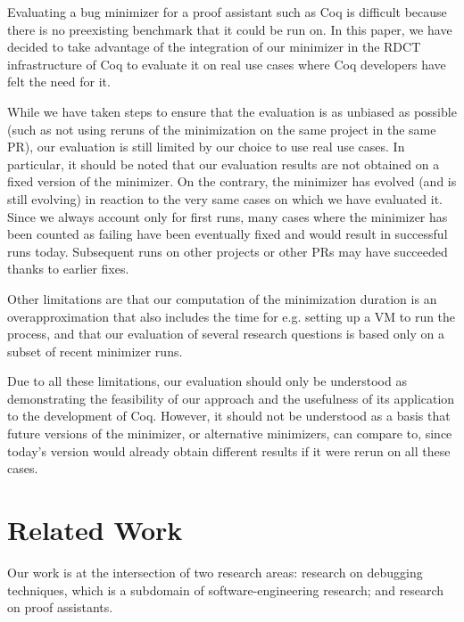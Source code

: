 \documentclass[a4paper,USenglish,cleveref,autoref,thm-restate,pdfa]{lipics-v2021}
\begin{document}
Evaluating a bug minimizer for a proof assistant such as Coq is difficult because there is no preexisting benchmark that it could be run on. In this paper, we have decided to take advantage of the integration of our minimizer in the RDCT infrastructure of Coq to evaluate it on real use cases where Coq developers have felt the need for it.

While we have taken steps to ensure that the evaluation is as unbiased as possible (such as not using reruns of the  minimization on the same project in the same PR), our evaluation is still limited by our choice to use real use cases. In particular, it should be noted that our evaluation results are not obtained on a fixed version of the minimizer. On the contrary, the minimizer has evolved (and is still evolving) in reaction to the very same cases on which we have evaluated it.
Since we always account only for first runs, many cases where the minimizer has been counted as failing have been eventually fixed and would result in successful runs today. Subsequent runs on other projects or other PRs may have succeeded thanks to earlier fixes.

Other limitations are that our computation of the minimization duration is an overapproximation that also includes the time for e.g. setting up a VM to run the process, and that our evaluation of several research questions is based only on a subset of recent minimizer runs.

Due to all these limitations, our evaluation should only be understood as demonstrating the feasibility of our approach and the usefulness of its application to the development of Coq. However, it should not be understood as a basis that future versions of the minimizer, or alternative minimizers, can compare to, since today's version would already obtain different results if it were rerun on all these cases.

\section{Related Work}\label{sec:related-work}

Our work is at the intersection of two research areas: research on debugging techniques, which is a subdomain of software-engineering research; and research on proof assistants.
\end{document}
